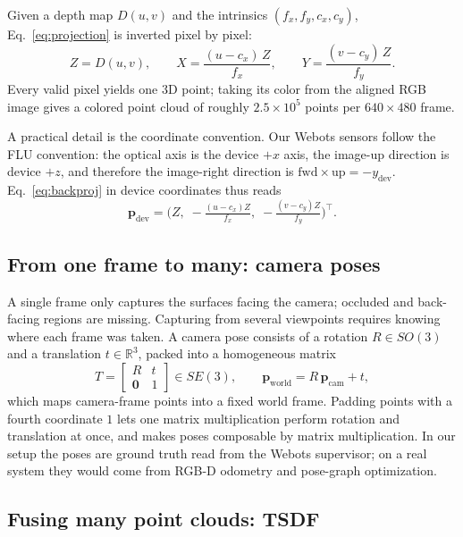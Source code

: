 \documentclass[11pt,a4paper]{article}
\begin{document}
Given a depth map $D(u,v)$ and the intrinsics $(f_x,f_y,c_x,c_y)$,
Eq.~\eqref{eq:projection} is inverted pixel by pixel:
\begin{equation}
Z=D(u,v),\qquad
X=\frac{(u-c_x)\,Z}{f_x},\qquad
Y=\frac{(v-c_y)\,Z}{f_y}.
\label{eq:backproj}
\end{equation}
Every valid pixel yields one 3D point; taking its color from the aligned RGB
image gives a colored point cloud of roughly $2.5\times10^{5}$ points per
$640\times480$ frame.

A practical detail is the coordinate convention. Our Webots sensors follow the
FLU convention: the optical axis is the device $+x$ axis, the image-up
direction is device $+z$, and therefore the image-right direction is
$\text{fwd}\times\text{up}=-y_{\text{dev}}$. Eq.~\eqref{eq:backproj} in device
coordinates thus reads
\begin{equation}
\bm p_{\text{dev}}=
\bigl(Z,\;-\tfrac{(u-c_x)Z}{f_x},\;-\tfrac{(v-c_y)Z}{f_y}\bigr)^\top .
\label{eq:backproj-flu}
\end{equation}

\subsection{From one frame to many: camera poses}

A single frame only captures the surfaces facing the camera; occluded and
back-facing regions are missing. Capturing from several viewpoints requires
knowing where each frame was taken. A camera pose consists of a rotation
$R\in SO(3)$ and a translation $t\in\mathbb{R}^3$, packed into a homogeneous
matrix
\begin{equation}
T=\begin{bmatrix}R & t\\ \bm 0 & 1\end{bmatrix}\in SE(3),
\qquad
\bm p_{\text{world}}=R\,\bm p_{\text{cam}}+t,
\label{eq:pose}
\end{equation}
which maps camera-frame points into a fixed world frame. Padding points with a
fourth coordinate $1$ lets one matrix multiplication perform rotation and
translation at once, and makes poses composable by matrix multiplication. In
our setup the poses are ground truth read from the Webots supervisor; on a real
system they would come from RGB-D odometry and pose-graph optimization.

\subsection{Fusing many point clouds: TSDF}
\label{sec:tsdf}
\end{document}
